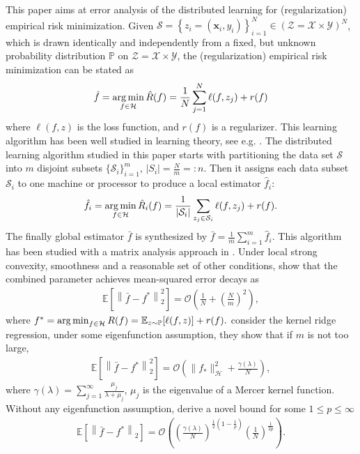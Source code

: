 \documentclass{article}
\newcommand{\argmin}{\operatornamewithlimits{arg\,min}}
\begin{document}
This paper aims at error analysis of the distributed learning for (regularization) empirical risk minimization.
Given $\mathcal{S}=\left\{z_i=(\mathbf  x_i,y_i)\right\}_{i=1}^N \in (\mathcal{Z}=\mathcal{X}\times \mathcal{Y})^N$,
which is drawn identically and independently from a fixed,
but unknown probability  distribution $\mathbb{P}$ on
$\mathcal{Z}=\mathcal{X}\times\mathcal{Y}$, 
the (regularization) empirical risk minimization can be stated as
\begin{align}
  \hat{f}=\argmin_{f\in\mathcal{H}} \hat{R}(f)=\frac{1}{N}\sum_{j=1}^N\ell(f,z_j)+r(f)
\end{align}
where $\ell(f,z)$ is the loss function, and $r(f)$ is a regularizer.
This learning algorithm  has been well studied in learning theory,
see e.g. \cite{de2005model,caponnetto2007optimal,steinwart2009optimal,smale2007learning,steinwart2008support}.
The distributed learning algorithm studied in this paper starts with partitioning the
data set $\mathcal{S}$ into $m$ disjoint subsets $\{\mathcal{S}_i\}_{i=1}^m$, $|S_i|=\frac{N}{m}=:n$.
Then it assigns each data subset $\mathcal{S}_i$ to one
machine or processor to produce a local estimator $\hat{f}_i$:
\begin{align*}
  \hat{f}_i=\argmin_{f\in\mathcal{H}}\hat{R}_i(f)=
    \frac{1}{|\mathcal{S}_i|}\sum_{z_j\in\mathcal{S}_i}\ell(f,z_j)+r(f).
\end{align*}
The finally  global estimator $\bar{f}$ is synthesized by 
$\bar{f}=\frac{1}{m}\sum_{i=1}^m\hat{f}_i.$
This algorithm has been studied with a matrix analysis approach in \cite{zhang2012communication,Zhang2013,lin2017distributed}.
Under local strong convexity, smoothness and a reasonable set of other conditions, \cite{zhang2012communication} show that the combined parameter achieves mean-squared error 
decays as
\begin{align*}
  \mathbb{E}\left[\left\|\bar{f}-f^\ast\right\|_2^2\right]=\mathcal{O}\left(\frac{1}{N}+\left(\frac{N}{m}\right)^2\right),
\end{align*}
where $f^\ast=\argmin_{f\in\mathcal{H}}R(f)=\mathbb{E}_{z\sim \mathbb{P}}[\ell(f,z)]+ r(f).$
\cite{Zhang2013} consider the kernel ridge regression,
under some eigenfunction assumption,
they show that if $m$ is not too large,
\begin{align*}
  \mathbb{E}\left[\left\|\bar{f}-f^\ast\right\|_2^2\right]=\mathcal{O}\left(\|f_\ast\|_\mathcal{H}^2+\frac{\gamma(\lambda)}{N}\right),
\end{align*}
where $\gamma(\lambda)=\sum_{j=1}^\infty\frac{\mu_j}{\lambda+\mu_j}$,
$\mu_j$ is the eigenvalue of a Mercer kernel function.
Without any eigenfunction assumption,
\cite{lin2017distributed} derive a novel bound for some $1\leq p\leq\infty$
\begin{align*}
  \mathbb{E}\left[\left\|\bar{f}-f^\ast\right\|_2\right]=
  \mathcal{O}\left(\left(\frac{\gamma(\lambda)}{N}\right)^{\frac{1}{2}(1-\frac{1}{p})}\left(\frac{1}{N}\right)^{\frac{1}{2p}}\right).
\end{align*}
\end{document}
